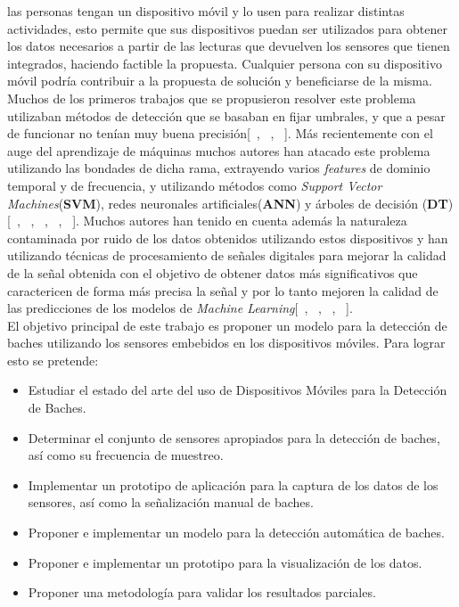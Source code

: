 las personas tengan un dispositivo móvil y lo usen para realizar distintas actividades, esto permite que sus dispositivos puedan ser utilizados
para obtener los datos necesarios a partir de las lecturas que devuelven los sensores que tienen integrados, haciendo factible la propuesta. 
Cualquier persona con su dispositivo móvil podría contribuir a la propuesta de solución y beneficiarse de la misma.\\
\indent Muchos de los primeros trabajos que se propusieron resolver este problema utilizaban métodos de detección que se basaban en fijar
umbrales, y que a pesar de funcionar no tenían muy buena precisión[~\parencite{eriksson2008pothole}, ~\parencite{mohan2008nericell},
~\parencite{mednis2011real}]. Más recientemente con el auge del aprendizaje de máquinas muchos autores han atacado este problema 
utilizando las bondades de dicha rama, extrayendo varios \emph{features} de dominio temporal y de frecuencia, y utilizando métodos
como \emph{Support Vector Machines}(\textbf{SVM}), redes neuronales artificiales(\textbf{ANN}) y árboles de decisión (\textbf{DT})
[~\parencite{el2018towards}, ~\parencite{seraj2015roads}, ~\parencite{gonzalez2017learning}, ~\parencite{zheng2020fused},
~\parencite{perttunen2011distributed}]. Muchos autores han tenido en cuenta además la naturaleza contaminada por ruido de los datos
obtenidos utilizando estos dispositivos y han utilizando técnicas de procesamiento de señales digitales para mejorar la calidad de
la señal obtenida con el objetivo de obtener datos más significativos que caractericen de forma más precisa la señal y por lo tanto mejoren la
calidad de las predicciones de los modelos de \emph{Machine Learning}[~\parencite{el2018towards}, ~\parencite{zheng2020fused},
~\parencite{perttunen2011distributed}, ~\parencite{gonzalez2017learning}].\\
\indent El objetivo principal de este trabajo es proponer un modelo para la detección de baches utilizando los sensores embebidos en los
dispositivos móviles. Para lograr esto se pretende:

\begin{itemize}
	\item Estudiar el estado del arte del uso de Dispositivos Móviles para la Detección de Baches.
	\item Determinar el conjunto de sensores apropiados para la detección de baches, así como su frecuencia de muestreo.
	\item Implementar un prototipo de aplicación para la captura de los datos de los sensores, así como la señalización
		manual de baches.
	\item Proponer e implementar un modelo para la detección automática de baches.
	\item Proponer e implementar un prototipo para la visualización de los datos.
	\item Proponer una metodología para validar los resultados parciales.
\end{itemize}
